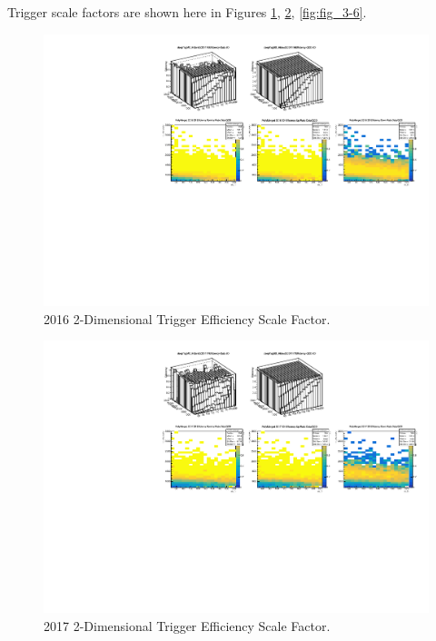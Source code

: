 Trigger scale factors are shown here in Figures \ref{fig:fig_3-4}, \ref{fig:fig_3-5}, \ref{fig:fig_3-6}.
\begin{figure}[!htb]
	\centering
	\includegraphics[width=1.0\textwidth]{Figures/2016triggerMaps.pdf}
	\caption{2016 2-Dimensional Trigger Efficiency Scale Factor.}
	\label{fig:fig_3-4}
\end{figure}
\begin{figure}[!htb]
	\centering
	\includegraphics[width=1.0\textwidth]{Figures/2017triggerMaps.pdf}
	\caption{2017 2-Dimensional Trigger Efficiency Scale Factor.}
	\label{fig:fig_3-5}
\end{figure}
